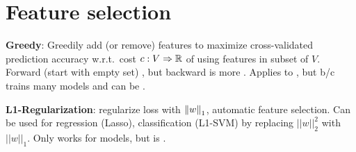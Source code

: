 \section{Feature selection}
\textbf{Greedy}: Greedily add (or remove) features to maximize cross-validated prediction accuracy w.r.t.\ cost $c: V \Rightarrow \mathbb{R}$ of using features in subset of $V$. Forward (start with empty set) , but backward is more . Applies to , but  b/c trains many models and can be .

\textbf{L1-Regularization}: regularize loss with $\left\lVert w\right\rVert_1$, automatic feature
selection. Can be used for regression (Lasso), classification (L1-SVM) by replacing $||w||_2^2$ with $||w||_1$. Only works for  models, but is .

